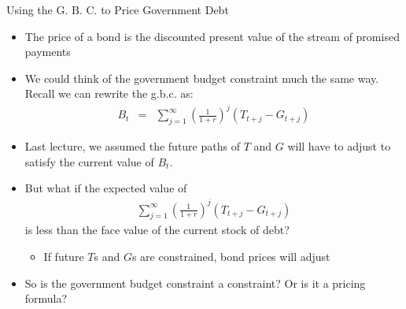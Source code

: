 \documentclass[professionalfonts,small]{beamer}
\begin{document}
\begin{frame}{Using the G. B. C. to Price Government Debt}
\medskip

\begin{itemize}

\item The price of a bond is the discounted present value of the stream of promised payments

\medskip

\item We could think of the government budget constraint much the same way.  Recall we can rewrite the g.b.c. as:
\begin{eqnarray*}
B_{t}  &=&   \sum_{j=1}^{\infty} \left(\frac{1}{1+r}\right)^{j}(T_{t+j} - G_{t+j})
\end{eqnarray*}

\medskip

\item Last lecture, we assumed the future paths of $T$ and $G$ will have to
adjust to satisfy the current value of $B_t$.

\end{itemize}
\end{frame}

\begin{frame}
\begin{itemize}

\item But what if the expected value of
\begin{eqnarray*}
\sum_{j=1}^{\infty} \left(\frac{1}{1+r}\right)^{j}(T_{t+j} - G_{t+j})
\end{eqnarray*}
 is less than the face value of the current stock of debt?
\begin{itemize}
\item If future $T$s and $G$s are constrained, bond prices will adjust
\end{itemize}

\bigskip

\item So is the government budget constraint a constraint?  Or is it a pricing formula?

\end{itemize}
\end{frame}
\end{document}
